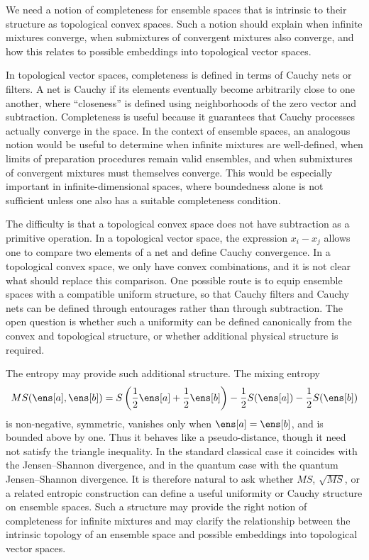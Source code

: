 {We need a notion of completeness for ensemble spaces that is intrinsic to their structure as topological convex spaces. Such a notion should explain when infinite mixtures converge, when submixtures of convergent mixtures also converge, and how this relates to possible embeddings into topological vector spaces.}

In topological vector spaces, completeness is defined in terms of Cauchy nets or filters. A net is Cauchy if its elements eventually become arbitrarily close to one another, where ``closeness'' is defined using neighborhoods of the zero vector and subtraction. Completeness is useful because it guarantees that Cauchy processes actually converge in the space. In the context of ensemble spaces, an analogous notion would be useful to determine when infinite mixtures are well-defined, when limits of preparation procedures remain valid ensembles, and when submixtures of convergent mixtures must themselves converge. This would be especially important in infinite-dimensional spaces, where boundedness alone is not sufficient unless one also has a suitable completeness condition.

The difficulty is that a topological convex space does not have subtraction as a primitive operation. In a topological vector space, the expression \(x_i-x_j\) allows one to compare two elements of a net and define Cauchy convergence. In a topological convex space, we only have convex combinations, and it is not clear what should replace this comparison. One possible route is to equip ensemble spaces with a compatible uniform structure, so that Cauchy filters and Cauchy nets can be defined through entourages rather than through subtraction. The open question is whether such a uniformity can be defined canonically from the convex and topological structure, or whether additional physical structure is required.

The entropy may provide such additional structure. The mixing entropy
\[
MS(\ens[a],\ens[b])
=
S\left(\frac{1}{2}\ens[a]+\frac{1}{2}\ens[b]\right)
-
\frac{1}{2}S(\ens[a])
-
\frac{1}{2}S(\ens[b])
\]
is non-negative, symmetric, vanishes only when \(\ens[a]=\ens[b]\), and is bounded above by one. Thus it behaves like a pseudo-distance, though it need not satisfy the triangle inequality. In the standard classical case it coincides with the Jensen--Shannon divergence, and in the quantum case with the quantum Jensen--Shannon divergence. It is therefore natural to ask whether \(MS\), \(\sqrt{MS}\), or a related entropic construction can define a useful uniformity or Cauchy structure on ensemble spaces. Such a structure may provide the right notion of completeness for infinite mixtures and may clarify the relationship between the intrinsic topology of an ensemble space and possible embeddings into topological vector spaces.

